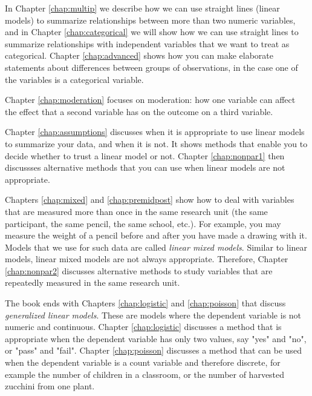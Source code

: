 \documentclass[]{book}\usepackage[]{graphicx}\usepackage[]{color}
\begin{document}
In Chapter \ref{chap:multip} we describe how we can use straight lines (linear models) to summarize relationships between more than two numeric variables, and in Chapter \ref{chap:categorical} we will show how we can use straight lines to summarize relationships with independent variables that we want to treat as categorical. Chapter \ref{chap:advanced} shows how you can make elaborate statements about differences between groups of observations, in the case one of the variables is a categorical variable.

Chapter \ref{chap:moderation} focuses on moderation: how one variable can affect the effect that a second variable has on the outcome on a third variable.

Chapter \ref{chap:assumptions} discusses when it is appropriate to use linear models to summarize your data, and when it is not. It shows methods that enable you to decide whether to trust a linear model or not. Chapter \ref{chap:nonpar1} then discussses alternative methods that you can use when linear models are not appropriate.

Chapters \ref{chap:mixed} and \ref{chap:premidpost} show how to deal with variables that are measured more than once in the same research unit (the same participant, the same pencil, the same school, etc.). For example, you may measure the weight of a pencil before and after you have made a drawing with it. Models that we use for such data are called \textit{linear mixed models}. Similar to linear models, linear mixed models are not always appropriate. Therefore, Chapter \ref{chap:nonpar2} discusses alternative methods to study variables that are repeatedly measured in the same research unit.

The book ends with Chapters \ref{chap:logistic} and \ref{chap:poisson} that discuss \textit{generalized linear models}. These are models where the dependent variable is not numeric and continuous. Chapter \ref{chap:logistic} discusses a method that is appropriate when the dependent variable has only two values, say "yes" and "no", or "pass" and "fail". Chapter \ref{chap:poisson} discusses a method that can be used when the dependent variable is a count variable and therefore discrete, for example the number of children in a classroom, or the number of harvested zucchini from one plant.
\end{document}
